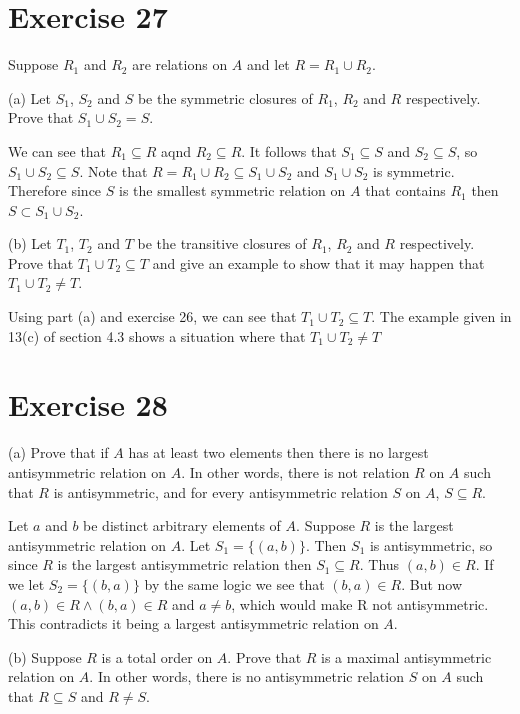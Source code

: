 \documentclass[11pt]{article}
\begin{document}
\section*{Exercise 27}

Suppose $R_1$ and $R_2$ are relations on $A$ and let $R = R_1 \cup R_2$.

\noindent (a) Let $S_1$, $S_2$ and $S$ be the symmetric closures of 
$R_1$, $R_2$ and $R$ respectively. Prove that $S_1 \cup S_2 = S$.

We can see that $R_1 \subseteq R$ aqnd $R_2 \subseteq R$. It follows that 
$S_1 \subseteq S$ and $S_2 \subseteq S$, so $S_1 \cup S_2 \subseteq S$.
Note that $R = R_1 \cup R_2 \subseteq S_1 \cup S_2$ and $S_1 \cup S_2$ is 
symmetric. Therefore since $S$ is the smallest symmetric relation on $A$ 
that contains $R_1$ then $S \subset S_1 \cup S_2$.

\noindent (b) Let $T_1$, $T_2$ and $T$ be the transitive closures of 
$R_1$, $R_2$ and $R$ respectively. Prove that $T_1 \cup T_2 \subseteq T$
and give an example to show that it may happen that $T_1 \cup T_2 \neq T$.

Using part (a) and exercise 26, we can see that $T_1 \cup T_2 \subseteq T$.
The example given in 13(c) of section 4.3 shows a situation where that $T_1 \cup T_2 \neq T$

\section*{Exercise 28}

\noindent (a) Prove that if $A$ has at least two elements then there is no 
largest antisymmetric relation on $A$. In other words, there is not relation 
$R$ on $A$ such that $R$ is antisymmetric, and for every antisymmetric relation 
$S$ on $A$, $S \subseteq R$.

Let $a$ and $b$ be distinct arbitrary elements of $A$. Suppose $R$ is the 
largest antisymmetric relation on $A$. Let $S_1 = \{ (a,b) \}$. Then $S_1$ is 
antisymmetric, so since $R$ is the largest antisymmetric relation then 
$S_1 \subseteq R$. Thus $(a, b) \in R$. If we let $S_2 = \{(b,a)\}$ by the same 
logic we see that $(b,a) \in R$. But now $(a,b) \in R \wedge (b,a) \in R$ and 
$a \neq b$, which would make R not antisymmetric. This contradicts it being 
a largest antisymmetric relation on $A$.

\noindent (b) Suppose $R$ is a total order on $A$. Prove that $R$ is a maximal 
antisymmetric relation on $A$. In other words, there is no antisymmetric relation 
$S$ on $A$ such that $R \subseteq S$ and $R \neq S$.
\end{document}
